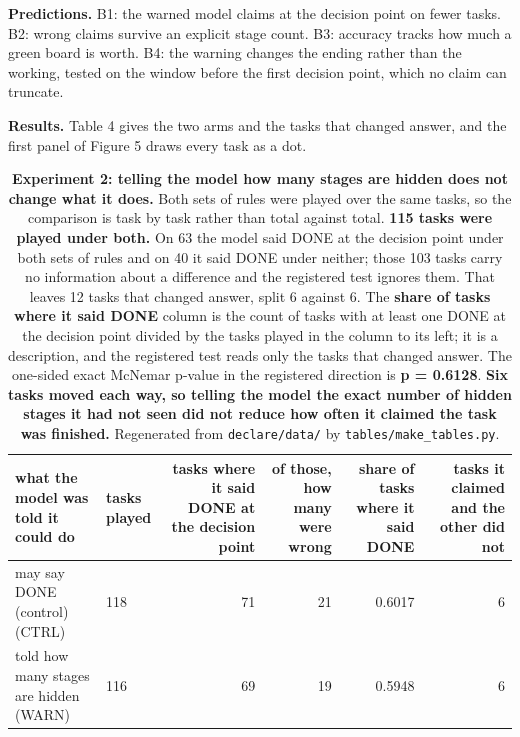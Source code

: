 \documentclass[11pt]{article}
\begin{document}
\textbf{Predictions.} B1: the warned model claims at the decision point on fewer tasks. B2: wrong claims survive an explicit stage count. B3: accuracy tracks how much a green board is worth. B4: the warning changes the ending rather than the working, tested on the window before the first decision point, which no claim can truncate.

\textbf{Results.} Table 4 gives the two arms and the tasks that changed answer, and the first panel of Figure 5 draws every task as a dot.

\begin{table}[t]
\centering
\small
\setlength{\tabcolsep}{3.4pt}
\begin{tabularx}{\textwidth}{L{2.858}L{0.571}R{0.762}R{0.571}R{0.571}R{0.667}}
\toprule
\textbf{what the model was told it could do} & \textbf{tasks played} & \textbf{tasks where it said DONE at the decision point} & \textbf{of those, how many were wrong} & \textbf{share of tasks where it said DONE} & \textbf{tasks it claimed and the other did not} \\
\midrule
may say DONE (control) (CTRL) & 118 & 71 & 21 & 0.6017 & 6 \\
told how many stages are hidden (WARN) & 116 & 69 & 19 & 0.5948 & 6 \\
\bottomrule
\end{tabularx}
\caption{\textbf{Experiment 2: telling the model how many stages are hidden does not change what it does.} Both sets of rules were played over the same tasks, so the comparison is task by task rather than total against total. \textbf{115 tasks were played under both.} On 63 the model said DONE at the decision point under both sets of rules and on 40 it said DONE under neither; those 103 tasks carry no information about a difference and the registered test ignores them. That leaves 12 tasks that changed answer, split 6 against 6. The \textbf{share of tasks where it said DONE} column is the count of tasks with at least one DONE at the decision point divided by the tasks played in the column to its left; it is a description, and the registered test reads only the tasks that changed answer. The one-sided exact McNemar p-value in the registered direction is \textbf{p = 0.6128}. \textbf{Six tasks moved each way, so telling the model the exact number of hidden stages it had not seen did not reduce how often it claimed the task was finished.} Regenerated from \texttt{declare/data/} by \texttt{tables/make\_tables.py}.}
\label{tab:T4}
\end{table}
\end{document}
